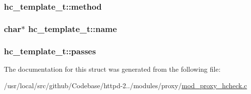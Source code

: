 \subsubsection[{\texorpdfstring{method}{method}}]{ hc\+\_\+template\+\_\+t\+::method}\hypertarget{structhc__template__t_a61da58b226d3dc1eba00e7710d86bb5a}{}\label{structhc__template__t_a61da58b226d3dc1eba00e7710d86bb5a}
\subsubsection[{\texorpdfstring{name}{name}}]{\setlength{\rightskip}{0pt plus 5cm}char$\ast$ hc\+\_\+template\+\_\+t\+::name}\hypertarget{structhc__template__t_a7691abe48318552a90bc6af19561eaef}{}\label{structhc__template__t_a7691abe48318552a90bc6af19561eaef}
\subsubsection[{\texorpdfstring{passes}{passes}}]{ hc\+\_\+template\+\_\+t\+::passes}\hypertarget{structhc__template__t_a0f78c5312c98825ca2cc335b7e2ecba0}{}\label{structhc__template__t_a0f78c5312c98825ca2cc335b7e2ecba0}


The documentation for this struct was generated from the following file\+:\begin{DoxyCompactItemize}
\item 
/usr/local/src/github/\+Codebase/httpd-\/2../modules/proxy/\hyperlink{mod__proxy__hcheck_8c}{mod\+\_\+proxy\+\_\+hcheck.\+c}\end{DoxyCompactItemize}

